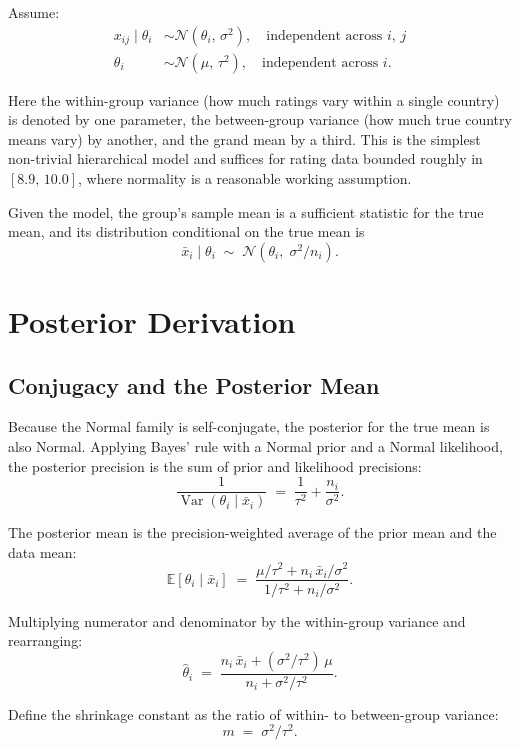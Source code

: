 \documentclass[11pt]{article}
\begin{document}
Assume:
\begin{align*}
    x_{ij} \mid \theta_i &\sim \mathcal{N}(\theta_i,\, \sigma^2),
        \quad \text{independent across } i,\,j \\
    \theta_i &\sim \mathcal{N}(\mu,\, \tau^2),
        \quad \text{independent across } i.
\end{align*}

Here the within-group variance (how much ratings vary within a single
country) is denoted by one parameter, the between-group variance (how
much true country means vary) by another, and the grand mean by a third.
This is the simplest non-trivial hierarchical model and suffices for
rating data bounded roughly in $[8.9,\, 10.0]$, where normality is a
reasonable working assumption.

Given the model, the group's sample mean is a sufficient statistic for
the true mean, and its distribution conditional on the true mean is
\[
    \bar{x}_i \mid \theta_i \;\sim\; \mathcal{N}\!\left(\theta_i,\; \sigma^2 / n_i\right).
\]

\section{Posterior Derivation}

\subsection{Conjugacy and the Posterior Mean}

Because the Normal family is self-conjugate, the posterior for the true
mean is also Normal. Applying Bayes' rule with a Normal prior and a
Normal likelihood, the posterior precision is the sum of prior and
likelihood precisions:
\[
    \frac{1}{\operatorname{Var}(\theta_i \mid \bar{x}_i)}
        \;=\; \frac{1}{\tau^2} + \frac{n_i}{\sigma^2}.
\]

The posterior mean is the precision-weighted average of the prior mean
and the data mean:
\[
    \mathbb{E}[\theta_i \mid \bar{x}_i]
        \;=\; \frac{\mu / \tau^2 + n_i\,\bar{x}_i / \sigma^2}{1/\tau^2 + n_i / \sigma^2}.
\]

Multiplying numerator and denominator by the within-group variance and
rearranging:
\[
    \hat{\theta}_i \;=\; \frac{n_i\,\bar{x}_i + (\sigma^2 / \tau^2)\,\mu}{n_i + \sigma^2 / \tau^2}.
\]

Define the shrinkage constant as the ratio of within- to between-group
variance:
\[
    m \;=\; \sigma^2 / \tau^2.
\]
\end{document}
